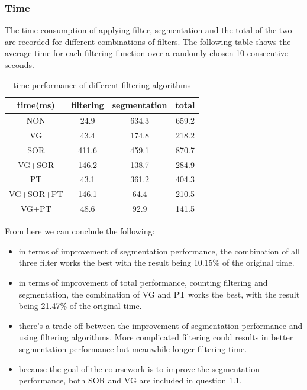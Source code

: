 \subsubsection*{Time}
The time consumption of applying filter, segmentation and the total of the two are recorded for different combinations of filters. The following table shows the average time for each filtering function over a randomly-chosen 10 consecutive seconds.
\begin{table}[h!]
\begin{center}
 \begin{tabular}{|c c c c|}
 \hline 
 time(ms) & filtering &  segmentation & total \\
 \hline 
 NON &  24.9 &  634.3 &  659.2\\
 \hline 
 VG &  43.4 &  174.8 &  218.2\\
 \hline 
 SOR &  411.6&  459.1 &  870.7\\
 \hline 
 VG+SOR &  146.2 &  138.7 &  284.9 \\
 \hline 
 PT &  43.1 &  361.2&  404.3 \\
 \hline 
 VG+SOR+PT &  146.1 &  64.4 &   210.5\\
  \hline 
 VG+PT &  48.6 &  92.9 &  141.5 \\
 \hline
\end{tabular}
\end{center}
\caption{time performance of different filtering algorithms}
\label{table:1}
\end{table}

From here we can conclude the following:
\begin{itemize}
    \item in terms of improvement of segmentation performance, the combination of all three filter works the best with the result being 10.15\% of the original time.
    \item in terms of improvement of total performance, counting filtering and segmentation, the combination of VG and PT works the best, with the result being 21.47\% of the original time.
    \item there's a trade-off between the improvement of segmentation performance and using filtering algorithms. More complicated filtering could results in better segmentation performance but meanwhile longer filtering time. 
    \item because the goal of the coursework is to improve the segmentation performance, both SOR and VG are included in question 1.1. 
\end{itemize}

